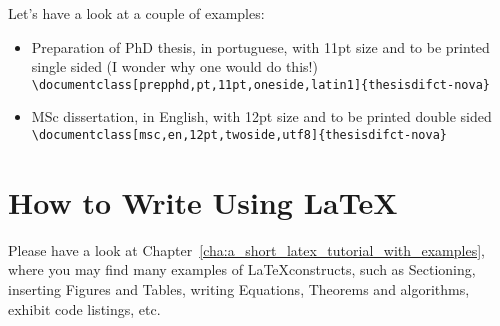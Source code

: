 Let's have a look at a couple of examples:

\begin{itemize}
  \item Preparation of PhD thesis, in portuguese, with 11pt size and to be printed single sided (I wonder why one would do this!)\\
  \verb!\documentclass[prepphd,pt,11pt,oneside,latin1]{thesisdifct-nova}!
  \item MSc dissertation, in English, with 12pt size and to be printed double sided\\
  \verb!\documentclass[msc,en,12pt,twoside,utf8]{thesisdifct-nova}!
\end{itemize}

\section{How to Write Using \LaTeX}
\label{sec:how_to_write_using_latex}

Please have a look at Chapter~\ref{cha:a_short_latex_tutorial_with_examples}, where you may find many examples of \LaTeX constructs, such as Sectioning, inserting Figures and Tables, writing Equations, Theorems and algorithms, exhibit code listings, etc.







